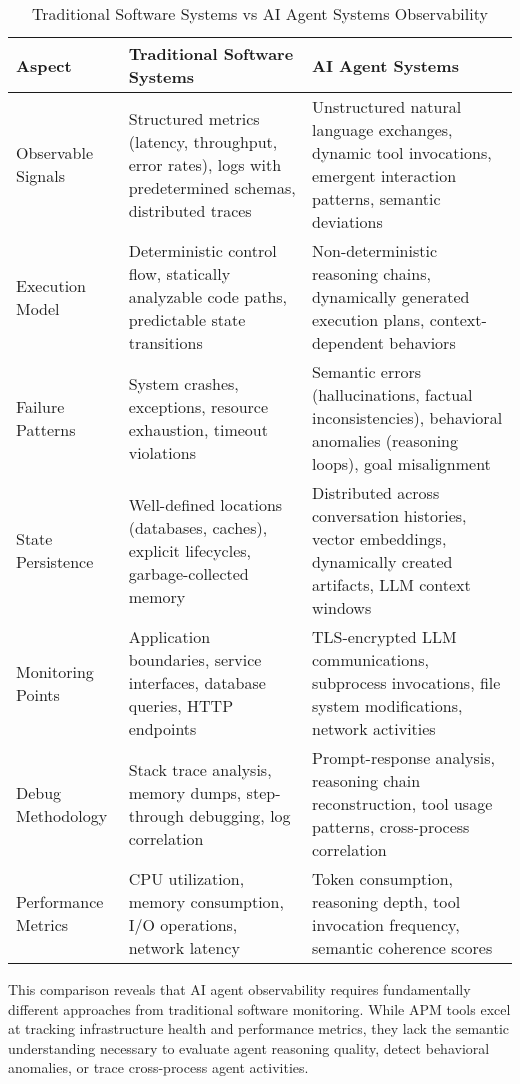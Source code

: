 \begin{table*}[t]
  \caption{Traditional Software Systems vs AI Agent Systems Observability}
  \label{tab:diff}
  \begin{tabularx}{\linewidth}{@{}>{\raggedright\arraybackslash}p{2.85cm}X X@{}}
    \toprule
    \textbf{Aspect} &
    \textbf{Traditional Software Systems} &
    \textbf{AI Agent Systems} \\
    \midrule
    Observable Signals &
    Structured metrics (latency, throughput, error rates), logs with predetermined schemas, distributed traces &
    Unstructured natural language exchanges, dynamic tool invocations, emergent interaction patterns, semantic deviations \\
    Execution Model &
    Deterministic control flow, statically analyzable code paths, predictable state transitions &
    Non-deterministic reasoning chains, dynamically generated execution plans, context-dependent behaviors \\
    Failure Patterns &
    System crashes, exceptions, resource exhaustion, timeout violations &
    Semantic errors (hallucinations, factual inconsistencies), behavioral anomalies (reasoning loops), goal misalignment \\
    State Persistence &
    Well-defined locations (databases, caches), explicit lifecycles, garbage-collected memory &
    Distributed across conversation histories, vector embeddings, dynamically created artifacts, LLM context windows \\
    Monitoring Points &
    Application boundaries, service interfaces, database queries, HTTP endpoints &
    TLS-encrypted LLM communications, subprocess invocations, file system modifications, network activities \\
    Debug Methodology &
    Stack trace analysis, memory dumps, step-through debugging, log correlation &
    Prompt-response analysis, reasoning chain reconstruction, tool usage patterns, cross-process correlation \\
    Performance Metrics &
    CPU utilization, memory consumption, I/O operations, network latency &
    Token consumption, reasoning depth, tool invocation frequency, semantic coherence scores \\
    \bottomrule
  \end{tabularx}
\end{table*}

This comparison reveals that AI agent observability requires fundamentally different approaches from traditional software monitoring. While APM tools excel at tracking infrastructure health and performance metrics, they lack the semantic understanding necessary to evaluate agent reasoning quality, detect behavioral anomalies, or trace cross-process agent activities.

